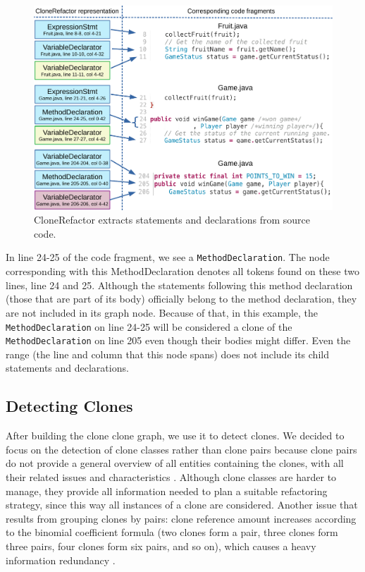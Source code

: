 \begin{figure}[H]
  \centering
  \includegraphics[width=1\columnwidth]{img/CloneGraphCode}
  \caption{CloneRefactor extracts statements and declarations from source code.}
  \label{fig:clonegraph}
\end{figure}

In line 24-25 of the code fragment, we see a \texttt{MethodDeclaration}. The node corresponding with this MethodDeclaration denotes all tokens found on these two lines, line 24 and 25. Although the statements following this method declaration (those that are part of its body) officially belong to the method declaration, they are not included in its graph node. Because of that, in this example, the \texttt{MethodDeclaration} on line 24-25 will be considered a clone of the \texttt{MethodDeclaration} on line 205 even though their bodies might differ. Even the range (the line and column that this node spans) does not include its child statements and declarations.

\subsection{Detecting Clones} \label{sec:detectingclones}
After building the clone clone graph, we use it to detect clones. We decided to focus on the detection of clone classes rather than clone pairs because clone pairs do not provide a general overview of all entities containing the clones, with all their related issues and characteristics \cite{fontana2012duplicated}. Although clone classes are harder to manage, they provide all information needed to plan a suitable refactoring strategy, since this way all instances of a clone are considered. Another issue that results from grouping clones by pairs: clone reference amount increases according to the binomial coefficient formula (two clones form a pair, three clones form three pairs, four clones form six pairs, and so on), which causes a heavy information redundancy \cite{fontana2012duplicated}.


